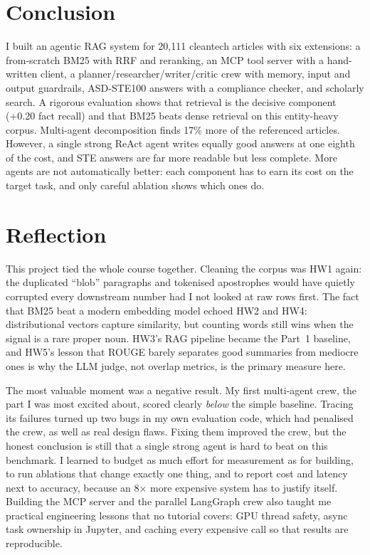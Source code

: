 \documentclass[conference]{IEEEtran}
\begin{document}
\section{Conclusion}
I built an agentic RAG system for 20{,}111 cleantech articles with six extensions: a from-scratch BM25 with RRF and
reranking, an MCP tool server with a hand-written client, a planner/researcher/writer/critic crew with memory,
input and output guardrails, ASD-STE100 answers with a compliance checker, and scholarly search. A rigorous
evaluation shows that retrieval is the decisive component (+0.20 fact recall) and that BM25 beats dense
retrieval on this entity-heavy corpus. Multi-agent decomposition finds 17\% more of the referenced articles.
However, a single strong ReAct agent writes equally good answers at one eighth of the cost, and STE answers are far
more readable but less complete. More agents are not automatically better: each component has to earn its cost on
the target task, and only careful ablation shows which ones do.

\section{Reflection}
This project tied the whole course together. Cleaning the corpus was HW1 again: the duplicated ``blob''
paragraphs and tokenised apostrophes would have quietly corrupted every downstream number had I not looked at
raw rows first. The fact that BM25 beat a modern embedding model echoed HW2 and HW4: distributional vectors capture
similarity, but counting words still wins when the signal is a rare proper noun. HW3's RAG pipeline became
the Part~1 baseline, and HW5's lesson that ROUGE barely separates good summaries from mediocre ones is why the
LLM judge, not overlap metrics, is the primary measure here.

The most valuable moment was a negative result. My first multi-agent crew, the part I was most excited about,
scored clearly \emph{below} the simple baseline. Tracing its failures turned up two bugs in my own evaluation
code, which had penalised the crew, as well as real design flaws. Fixing them improved the crew, but the honest
conclusion is still that a single strong agent is hard to beat on this benchmark. I learned to budget as
much effort for measurement as for building, to run ablations that change exactly one thing, and to report cost
and latency next to accuracy, because an 8$\times$ more expensive system has to justify itself. Building the MCP
server and the parallel LangGraph crew also taught me practical engineering lessons that no tutorial covers: GPU
thread safety, async task ownership in Jupyter, and caching every expensive call so that results are reproducible.
\end{document}

